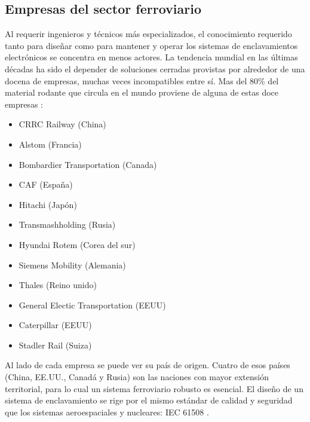 \subsection{Empresas del sector ferroviario}

    Al requerir ingenieros y técnicos más especializados, el conocimiento requerido tanto para diseñar como para mantener y operar los sistemas de enclavamientos electrónicos se concentra en menos actores. La tendencia mundial en las últimas décadas ha sido el depender de soluciones cerradas provistas por alrededor de una docena de empresas, muchas veces incompatibles entre sí. Mas del 80\% del material rodante que circula en el mundo proviene de alguna de estas doce empresas \cite{MARKET}:

    \begin{itemize}
        \item CRRC Railway (China) \cite{CRRC}
        \item Alstom (Francia) \cite{ALSTOM}
        \item Bombardier Transportation (Canada) \cite{BOMBARDIER}
        \item CAF (España) \cite{CAF}
        \item Hitachi (Japón) \cite{HITACHI}
        \item Transmashholding (Rusia) \cite{TRANSMASHHOLDING}
        \item Hyundai Rotem (Corea del sur) \cite{HYUNDAI}
        \item Siemens Mobility (Alemania) \cite{SIEMENS}
        \item Thales (Reino unido) \cite{THALES}
        \item General Electic Transportation (EEUU) \cite{GENERAL}
        \item Caterpillar (EEUU) \cite{CATERPILLAR}
        \item Stadler Rail (Suiza) \cite{STADLER}
    \end{itemize}
    
    Al lado de cada empresa se puede ver su país de origen. Cuatro de esos países (China, EE.UU., Canadá y Rusia) son las naciones con mayor extensión territorial, para lo cual un sistema ferroviario robusto es esencial. El diseño de un sistema de enclavamiento se rige por el mismo estándar de calidad y seguridad que los sistemas aeroespaciales y nucleares: IEC 61508 \cite{Paper_77,Paper_78,Paper_79,Paper_80,Paper_81,Paper_82,Paper_83}.

    